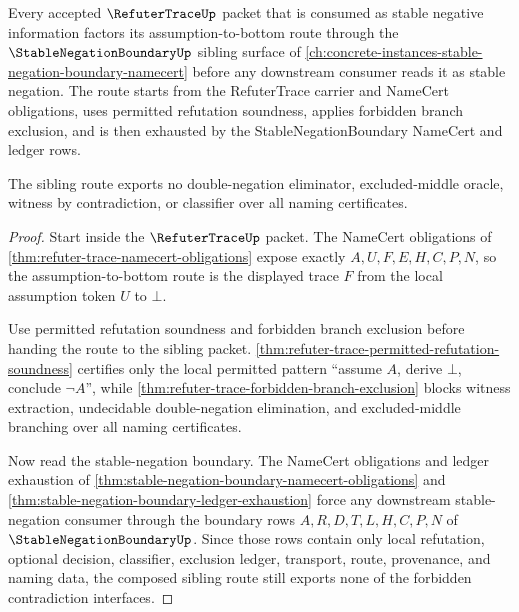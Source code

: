 \begin{theorem}
\label{thm:refuter-trace-stable-negation-sibling-route}
Every accepted $\RefuterTraceUp$ packet that is consumed as stable negative information factors its assumption-to-bottom route through the $\StableNegationBoundaryUp$ sibling surface of \autoref{ch:concrete-instances-stable-negation-boundary-namecert} before any downstream consumer reads it as stable negation. The route starts from the RefuterTrace carrier and NameCert obligations, uses permitted refutation soundness, applies forbidden branch exclusion, and is then exhausted by the StableNegationBoundary NameCert and ledger rows.

The sibling route exports no double-negation eliminator, excluded-middle oracle, witness by contradiction, or classifier over all naming certificates.
\end{theorem}
\begin{proof}
Start inside the $\RefuterTraceUp$ packet. The NameCert obligations of \autoref{thm:refuter-trace-namecert-obligations} expose exactly $A,U,F,E,H,C,P,N$, so the assumption-to-bottom route is the displayed trace $F$ from the local assumption token $U$ to $\bot$.

Use permitted refutation soundness and forbidden branch exclusion before handing the route to the sibling packet. \autoref{thm:refuter-trace-permitted-refutation-soundness} certifies only the local permitted pattern ``assume $A$, derive $\bot$, conclude $\neg A$'', while \autoref{thm:refuter-trace-forbidden-branch-exclusion} blocks witness extraction, undecidable double-negation elimination, and excluded-middle branching over all naming certificates.

Now read the stable-negation boundary. The NameCert obligations and ledger exhaustion of \autoref{thm:stable-negation-boundary-namecert-obligations} and \autoref{thm:stable-negation-boundary-ledger-exhaustion} force any downstream stable-negation consumer through the boundary rows $A,R,D,T,L,H,C,P,N$ of $\StableNegationBoundaryUp$. Since those rows contain only local refutation, optional decision, classifier, exclusion ledger, transport, route, provenance, and naming data, the composed sibling route still exports none of the forbidden contradiction interfaces.
\end{proof}


